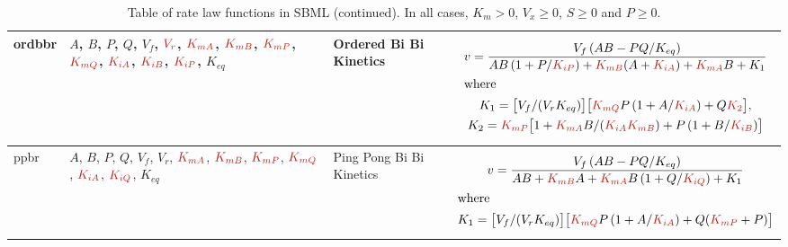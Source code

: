 \documentclass[10pt]{cekarticle}
\newcommand{\changed}[1]{\textcolor{BrickRed}{#1}}
\newenvironment{blockChanged}{\color{BrickRed}}{}
\begin{document}
\begin{table}[ht]
\begin{tabular}{|p{0.45in}|>{\raggedright}m{0.77in}|>{\raggedright}m{1.05in}|m{3.5in}|}
ordbbr & $A$, $B$, $P$, $Q$, $V_f$, $\changed{V_r}$, $\changed{K_{mA}}$, $\changed{K_{mB}}$, $\changed{K_{mP}}$, $\changed{K_{mQ}}$, 
$\changed{K_{iA}}$, $\changed{K_{iB}}$, $\changed{K_{iP}}$, $K_{eq}$ & Ordered Bi Bi Kinetics &
\begin{blockChanged}
\begin{gather*}
v = \frac{V_f
\left( A B - P Q/K_{eq}\right) }{A B \left( 1 + P/\changed{K_{iP}}\right) + \changed{K_{mB}}
(A + \changed{K_{iA}}) + \changed{K_{mA}} B + K_1} \\
\intertext{where}
K_1 = \bigl[ V_f / (V_r K_{eq}) \bigr] \bigl[ \changed{K_{mQ}} P \left( 1 + A/\changed{K_{iA}}\right) + Q \changed{K_2} \bigr] ,\\
K_2 = \changed{K_{mP}} \bigl[ 1 + \changed{K_{mA}} B /(\changed{K_{iA}} \changed{K_{mB}}) + P \left( 1 + B/\changed{K_{iB}} \right) \bigr]
\end{gather*}
\end{blockChanged}
\\ \hline

ppbr & $A$, $B$, $P$, $Q$, $V_f$, $V_r$, $\changed{K_{mA}}$, $\changed{K_{mB}}$, $\changed{K_{mP}}$, $\changed{K_{mQ}}$,
$\changed{K_{iA}}$, $\changed{K_{iQ}}$, $K_{eq}$ & Ping Pong Bi Bi Kinetics &
\begin{blockChanged}
\begin{gather*}
v = \frac{V_f
\left( A B - P Q /K_{eq} \right) }{A B + \changed{K_{mB}} A + \changed{K_{mA}} B \left( 1 +
  Q/\changed{K_{iQ}}\right)+ K_1 } \\
\intertext{where}
K_1 = \bigl[ V_f/(V_r K_{eq}) \bigr]
\bigl[ \changed{K_{mQ}} P \left( 1 + A/\changed{K_{iA}} \right) + Q (\changed{K_{mP}} + P) \bigr]
\end{gather*}
\end{blockChanged}
\\ \hline

\end{tabular}
\caption{Table of rate law functions in SBML (continued).  In all cases, $K_m > 0$, $V_x \geq 0$, $S
  \geq 0$ and $P \geq 0$.}
\end{table}
\end{document}
